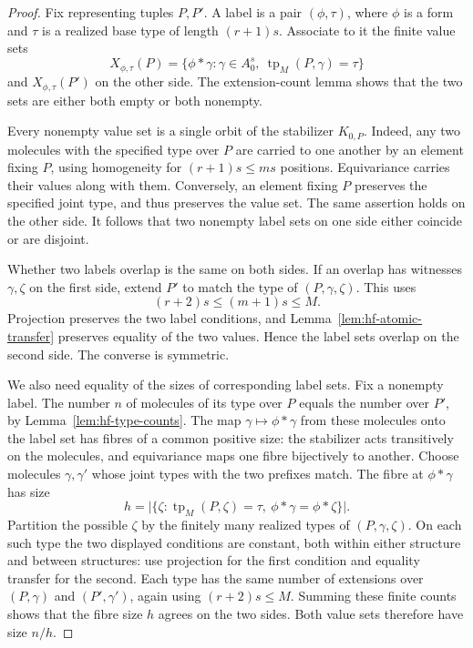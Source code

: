 \begin{proof}
Fix representing tuples $P,P'$.  A label is a pair $(\phi,\tau)$,
where $\phi$ is a form and $\tau$ is a realized base type of length
$(r+1)s$.  Associate to it the finite value sets
\[
 X_{\phi,\tau}(P)=
   \{\phi*\gamma:\gamma\in A_0^s,
             \ \operatorname{tp}_M(P,\gamma)=\tau\}
\]
and $X_{\phi,\tau}(P')$ on the other side.  The extension-count lemma
shows that the two sets are either both empty or both nonempty.

Every nonempty value set is a single orbit of the stabilizer $K_{0,P}$.
Indeed, any two molecules with the specified type over $P$ are carried
to one another by an element fixing $P$, using homogeneity for
$(r+1)s\leq ms$ positions.  Equivariance carries their values along with
them.  Conversely, an element fixing $P$ preserves the specified joint
type, and thus preserves the value set.  The same assertion holds on the
other side.  It follows that two nonempty label sets on one side either
coincide or are disjoint.

Whether two labels overlap is the same on both sides.  If an overlap has
witnesses $\gamma,\zeta$ on the first side, extend $P'$ to match the type
of $(P,\gamma,\zeta)$.  This uses
\[
 (r+2)s\leq(m+1)s\leq M.
\]
Projection preserves the two label conditions, and
Lemma~\ref{lem:hf-atomic-transfer} preserves equality of the two values.
Hence the label sets overlap on the second side.  The converse is
symmetric.

We also need equality of the sizes of corresponding label sets.  Fix a
nonempty label.  The number $n$ of molecules of its type over $P$ equals
the number over $P'$, by Lemma~\ref{lem:hf-type-counts}.  The map
$\gamma\mapsto\phi*\gamma$ from these molecules onto the label set has
fibres of a common positive size: the stabilizer acts transitively on the
molecules, and equivariance maps one fibre bijectively to another.
Choose molecules $\gamma,\gamma'$ whose joint types with the two prefixes
match.  The fibre at $\phi*\gamma$ has size
\[
 h=\bigl|\{\zeta:
       \operatorname{tp}_M(P,\zeta)=\tau,
       \ \phi*\gamma=\phi*\zeta\}\bigr|.
\]
Partition the possible $\zeta$ by the finitely many realized types of
$(P,\gamma,\zeta)$.  On each such type the two displayed conditions are
constant, both within either structure and between structures: use
projection for the first condition and equality transfer for the second.
Each type has the same number of extensions over $(P,\gamma)$ and
$(P',\gamma')$, again using $(r+2)s\leq M$.  Summing these finite counts
shows that the fibre size $h$ agrees on the two sides.  Both value sets
therefore have size $n/h$.


\end{proof}
